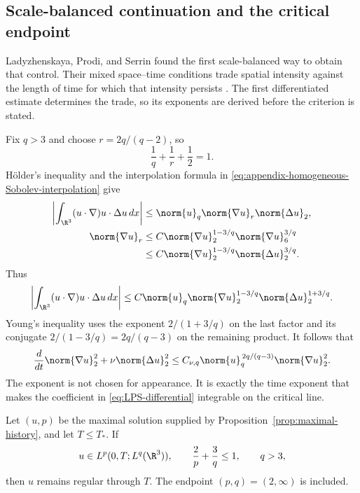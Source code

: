 \subsection{Scale-balanced continuation and the critical endpoint}
\label{sec:LPS}

Ladyzhenskaya, Prodi, and Serrin found the first scale-balanced way to obtain
that control.  Their mixed space--time conditions trade spatial intensity
against the length of time for which that intensity persists
.  The first differentiated
estimate determines the trade, so its exponents are derived before the
criterion is stated.

Fix \(q>3\) and choose \(r=2q/(q-2)\), so
\[
 \frac1q+\frac1r+\frac12=1.
\]
Hölder's inequality and the interpolation formula in
\eqref{eq:appendix-homogeneous-Sobolev-interpolation} give
\begin{align*}
 \left|\int_{\R^3}(u\cdot\nabla)u\cdot\Delta u\,dx\right|
 &\le \norm{u}_q\norm{\nabla u}_r\norm{\Delta u}_2,\\
 \norm{\nabla u}_r
 &\le C\norm{\nabla u}_2^{1-3/q}
          \norm{\nabla u}_6^{3/q}\\
 &\le C\norm{\nabla u}_2^{1-3/q}
          \norm{\Delta u}_2^{3/q}.
\end{align*}
Thus
\[
 \left|\int_{\R^3}(u\cdot\nabla)u\cdot\Delta u\,dx\right|
 \le
 C\norm{u}_q
 \norm{\nabla u}_2^{1-3/q}
 \norm{\Delta u}_2^{1+3/q}.
\]
Young's inequality uses the exponent \(2/(1+3/q)\) on the last factor and
its conjugate \(2/(1-3/q)=2q/(q-3)\) on the remaining product.  It follows
that
\begin{equation}
 \frac d{dt}\norm{\nabla u}_2^2
 +\nu\norm{\Delta u}_2^2
 \le
 C_{\nu,q}\norm{u}_q^{\,2q/(q-3)}
 \norm{\nabla u}_2^2.
 \label{eq:LPS-differential}
\end{equation}
The exponent is not chosen for appearance.  It is exactly the time exponent
that makes the coefficient in \eqref{eq:LPS-differential} integrable on the
critical line.

\begin{proposition}
\label{prop:LPS}
Let \((u,p)\) be the maximal solution supplied by
Proposition~\ref{prop:maximal-history}, and let \(T\le T_*\).
If
\begin{equation*}
 u\in L^p(0,T;L^q(\R^3)),
 \qquad
 \frac2p+\frac3q\le1,
 \qquad
 q>3,
\end{equation*}
then \(u\) remains regular through \(T\).  The endpoint
\((p,q)=(2,\infty)\) is included.
\end{proposition}

